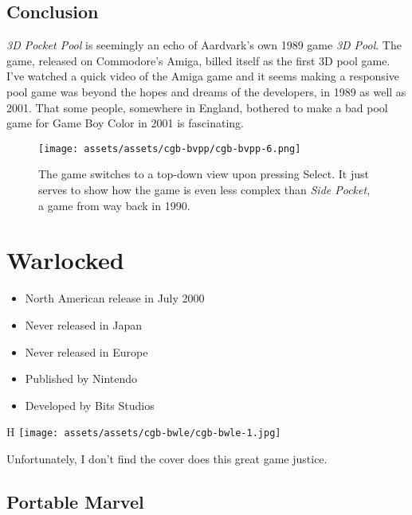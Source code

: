 \documentclass{book}
\begin{document}
\FloatBarrier\needspace{5pt}\section*{Conclusion}\nopagebreak[4]

\emph{3D Pocket Pool} is seemingly an echo of Aardvark’s own 1989 game \emph{3D Pool}. The game, released on Commodore’s Amiga, billed itself as the first 3D pool game. I’ve watched a quick video of the Amiga game and it seems making a responsive pool game was beyond the hopes and dreams of the developers, in 1989 as well as 2001. That some people, somewhere in England, bothered to make a bad pool game for Game Boy Color in 2001 is fascinating.

\begin{figure}[hbt]
\vskip 10pt
\centering \texttt{[image: assets/assets/cgb-bvpp/cgb-bvpp-6.png]}\par\pagetwodescription The game switches to a top-down view upon pressing Select. It just serves to show how the game is even less complex than \emph{Side Pocket}, a game from way back in 1990.
\vskip 6pt
\end{figure}


\begingroup \chapter*{Warlocked} \endgroup

\begin{itemize} \setlength\itemsep{-0.4em}
\item North American release in July 2000
\item Never released in Japan
\item Never released in Europe
\item Published by Nintendo
\item Developed by Bits Studios
\end{itemize}\noindent

\begin{wrapfigure}{H}{\linewidth}
\vskip 4pt
\centering \texttt{[image: assets/assets/cgb-bwle/cgb-bwle-1.jpg]}\par\pagetwodescription Unfortunately, I don’t find the cover does this great game justice.\end{wrapfigure}
\clearpage

\FloatBarrier\needspace{5pt}\section*{Portable Marvel}\nopagebreak[4]
\end{document}
